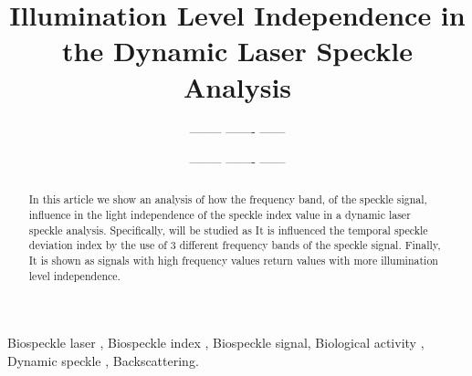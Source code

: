 \documentclass[review]{elsarticle}
\begin{document}
 

\begin{frontmatter}

\title{Illumination Level Independence in the Dynamic Laser Speckle Analysis}



\author{-------- ------- ------}
\author{-------- ------- ------}





\begin{abstract}
In this article we show an analysis of how the frequency band,
of the speckle signal, influence in the
light independence of the speckle index value in a dynamic laser speckle analysis. 
Specifically, 
will be studied as It is influenced the temporal speckle deviation 
index by the use of 3 different frequency bands of the speckle signal.
Finally, It is shown as signals with high frequency values
return values with more illumination level independence.
\end{abstract}

\begin{keyword}
Biospeckle laser \sep 
Biospeckle index \sep 
Biospeckle signal\sep 
Biological activity \sep
Dynamic speckle \sep  
Backscattering.
\end{keyword}

\end{frontmatter}

\linenumbers

\end{document}
